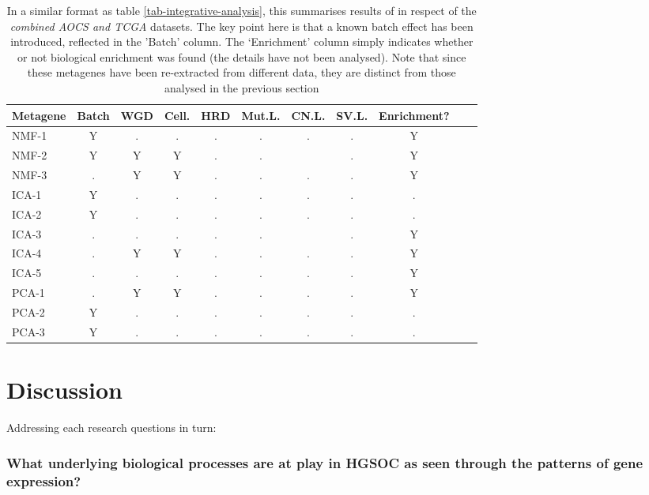 \documentclass[tikz, 12pt,a4paper,oneside,fleqn]{article}
\begin{document}
\begin{table}[htb!]
\begin{center}
\begingroup
\scriptsize
\renewcommand{\arraystretch}{1.4} %
\begin{tabular}{|l||c|c|c|c|c|c|c|c|l|l|}
\hline
Metagene & Batch & WGD & Cell. & HRD & Mut.L. & CN.L. & SV.L. & Enrichment? \\
\hline
NMF-1 & Y & . & . & . & . & . & . &  Y \\
NMF-2 & Y & Y & Y & . & . &   & . &  Y \\
NMF-3 & . & Y & Y & . & . & . & . &  Y \\
\hline
ICA-1 & Y & . & . & . & . & . & . &  . \\
ICA-2 & Y & . & . & . & . & . & . &  . \\
ICA-3 & . & . & . & . & . &   & . &  Y \\
ICA-4 & . & Y & Y & . & . & . & . &  Y \\
ICA-5 & . & . & . & . & . & . & . &  Y \\
\hline
PCA-1 & . & Y & Y & . & . & . & . &  Y \\
PCA-2 & Y & . & . & . & . & . & . &  . \\
PCA-3 & Y & . & . & . & . & . & . &  . \\
\hline
\end{tabular}
\endgroup
\end{center}
\caption{In a similar format as table \ref{tab-integrative-analysis}, this summarises results of in respect of the \emph{combined AOCS and TCGA} datasets.  The key point here is that a known batch effect has been introduced, reflected in the 'Batch' column.  The `Enrichment' column simply indicates whether or not biological enrichment was found (the details have not been analysed).   Note that since these metagenes have been re-extracted from different data, they are distinct from those analysed in the previous section}
\label{tab-integrative-analysis-BOTH}
\end{table}

\clearpage

\section{Discussion}

Addressing each research questions in turn:

\subsubsection*{What underlying biological processes are at play in HGSOC as seen through the patterns of gene expression? }
\end{document}
